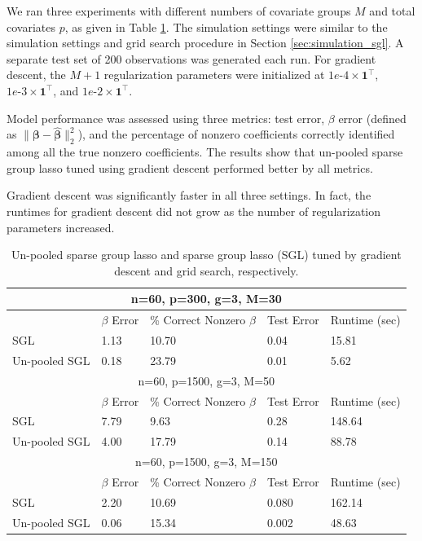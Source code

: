 \documentclass{statsoc}
\begin{document}
We ran three experiments with different numbers of covariate groups $M$ and total covariates $p$, as given in Table \ref{table:unpooled}. The simulation settings were similar to the simulation settings and grid search procedure in Section \ref{sec:simulation_sgl}. A separate test set of 200 observations was generated each run. For gradient descent, the $M+1$ regularization parameters were initialized at $1e\text{-}4 \times \boldsymbol 1^\top$, $1e\text{-}3 \times \boldsymbol 1^\top$, and $1e\text{-}2 \times \boldsymbol 1^\top$.

Model performance was assessed using three metrics: test error, $\beta$ error (defined as $\| \boldsymbol \beta - \hat {\boldsymbol \beta} \|_2 ^2$), and the percentage of nonzero coefficients correctly identified among all the true nonzero coefficients. The results show that un-pooled sparse group lasso tuned using gradient descent performed better by all metrics.

Gradient descent was significantly faster in all three settings. In fact, the runtimes for gradient descent did not grow as the number of regularization parameters increased.

\begin{table}
\caption{\label{table:unpooled} Un-pooled sparse group lasso and sparse group lasso (SGL) tuned by gradient descent and grid search, respectively.}
\centering
\begin{tabular}{| l | l | l | l | l | }
\hline
\multicolumn{5}{|c|}{n=60, p=300, g=3, M=30}\\
\hline
 & $\beta$ Error & \% Correct Nonzero $\beta$ & Test Error & Runtime (sec) \\
\hline
SGL & 1.13 & 10.70 & 0.04 & 15.81 \\
\hline
Un-pooled SGL & 0.18 & 23.79 & 0.01 & 5.62 \\
\hline
\multicolumn{5}{|c|}{n=60, p=1500, g=3, M=50}\\
\hline
 & $\beta$ Error & \% Correct Nonzero $\beta$ & Test Error & Runtime (sec) \\
\hline
SGL & 7.79 & 9.63 & 0.28 & 148.64 \\
\hline
Un-pooled SGL & 4.00 & 17.79 & 0.14 & 88.78 \\
\hline
\multicolumn{5}{|c|}{n=60, p=1500, g=3, M=150}\\
\hline
 & $\beta$ Error & \% Correct Nonzero $\beta$ & Test Error & Runtime (sec) \\
\hline
SGL & 2.20 & 10.69 & 0.080 & 162.14 \\
\hline
Un-pooled SGL & 0.06 & 15.34 & 0.002 & 48.63 \\
\hline
\end{tabular}
\end{table}
\end{document}
